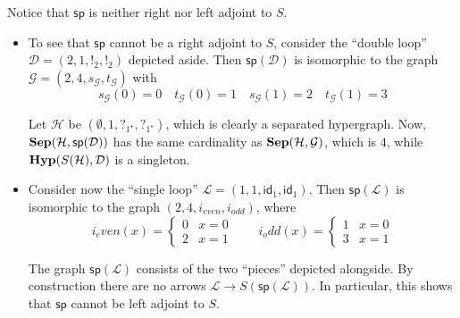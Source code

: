 \documentclass[3p]{elsarticle}
\newcommand{\catname}[1]{\textbf{\textup{#1}}}
\newcommand{\hyp}{\catname{Hyp}}
\newcommand{\shyp}{\catname{Sep}}
\renewcommand{\sp}{\mathsf{sp}}
\newcommand{\id}[1]{\mathsf{id}_{#1}}
\theoremstyle{remark}
\theoremstyle{definition}
\begin{document}
\noindent 
\begin{minipage}[l]{.8\linewidth}
\begin{rem}Notice that $\sp$ is neither right nor left adjoint to $S$.
	\begin{itemize}
		\item To see that $\sp$ cannot be a right adjoint to $S$, consider the ``double loop'' $\mathcal{D}=(2, 1, !_2, !_2)$ depicted aside. Then $\sp(\mathcal{D})$ is isomorphic to the graph $\mathcal{G}=(2, 4, s_{\mathcal{G}}, t_{\mathcal{G}})$ with
		\[s_{\mathcal{G}}(0) = 0 \quad  t_{\mathcal{G}}(0) =  1 \quad  s_{\mathcal{G}}(1) = 2 \quad  t_{\mathcal{G}}(1) = 3 \]
		
		Let $\mathcal{H}$ be $(\emptyset, 1, ?_{1^\star}, ?_{1^\star})$, which is clearly a separated hypergraph. Now,  $\shyp(\mathcal{H}, \sp(\mathcal{D}))$ has the same cardinality as  $\shyp(\mathcal{H}, \mathcal{G})$, which is $4$, while $\hyp(S(\mathcal{H}), \mathcal{D})$ is a singleton.
		\item Consider now the ``single loop'' $\mathcal{L}=(1, 1, \id{1}, \id{1})$. Then $\sp(\mathcal{L})$ is isomorphic to the graph $(2, 4, i_{even}, i_{odd})$, where
		\[i_even(x) = \begin{cases}
			0 & x= 0\\
			2 & x = 1
		\end{cases} \qquad i_odd(x) = \begin{cases}
		1 & x= 0\\
		3 & x = 1
		\end{cases} \]
		
		The graph $\sp(\mathcal{L})$ consists of the two ``pieces'' depicted alongside. By construction there are no arrows $\mathcal{L}\to S(\sp(\mathcal{L}))$. In particular, this shows that $\sp$ cannot be left adjoint to $S$. 
	\end{itemize} 
\end{rem}
\end{minipage}
\hfill
\end{document}
